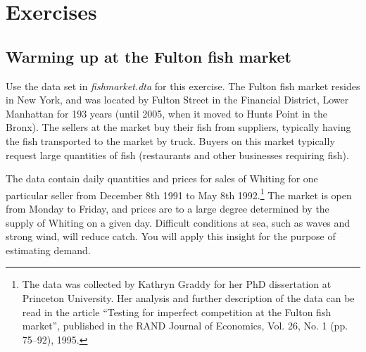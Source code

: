\documentclass[12pt,a4paper]{article}
\begin{document}
\section*{Exercises}

\subsection*{Warming up at the Fulton fish market}
Use the data set in \emph{fishmarket.dta} for this exercise. The Fulton fish market resides in New York, and was located by Fulton Street in the Financial District, Lower Manhattan for 193 years (until 2005, when it moved to Hunts Point in the Bronx). The sellers at the market buy their fish from suppliers, typically having the fish transported to the market by truck. Buyers on this market typically request large quantities of fish (restaurants and other businesses requiring fish).

The data contain daily quantities and prices for sales of Whiting for one particular seller from December 8th 1991 to May 8th 1992.\footnote{The data was collected by Kathryn Graddy for her PhD dissertation at Princeton University. Her analysis and further description of the data can be read in the article ``Testing for imperfect competition at the Fulton fish market'', published in the RAND Journal of Economics, Vol. 26, No. 1 (pp. 75--92), 1995.} The market is open from Monday to Friday, and prices are to a large degree determined by the supply of Whiting on a given day. Difficult conditions at sea, such as waves and strong wind, will reduce catch. You will apply this insight for the purpose of estimating demand.
\end{document}
